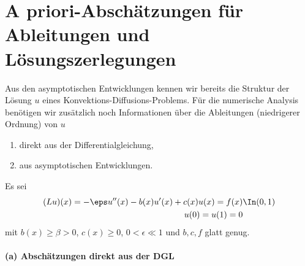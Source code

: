\section{A priori-Abschätzungen für Ableitungen und Lösungszerlegungen}
\label{sec:priori-absch-fur}

Aus den asymptotischen Entwicklungen kennen wir bereits die Struktur der Lösung $u$ eines Konvektions-Diffusions-Problems. Für die numerische Analysis benötigen wir zusätzlich noch Informationen über die Ableitungen (niedrigerer Ordnung) von $u$
\begin{enumerate}
\item direkt aus der Differentialgleichung, 
\item aus asymptotischen Entwicklungen. 
\end{enumerate}
Es sei
\begin{subequations}
  \label{eq:5-1}
\begin{align}
  (Lu)(x) = - \eps u''(x) - b(x) u'(x) + c(x) u(x) = f(x)& \In (0, 1)\\
u(0) = u(1) = 0 &
\end{align}
\end{subequations}
mit $b(x)\geq \beta > 0$, $c(x) \geq 0$, $0 < \epsilon \ll 1$ und $b, c, f$ glatt genug.
\paragraph{(a) Abschätzungen direkt aus der DGL}
\label{sec:a-absch-direkt}

